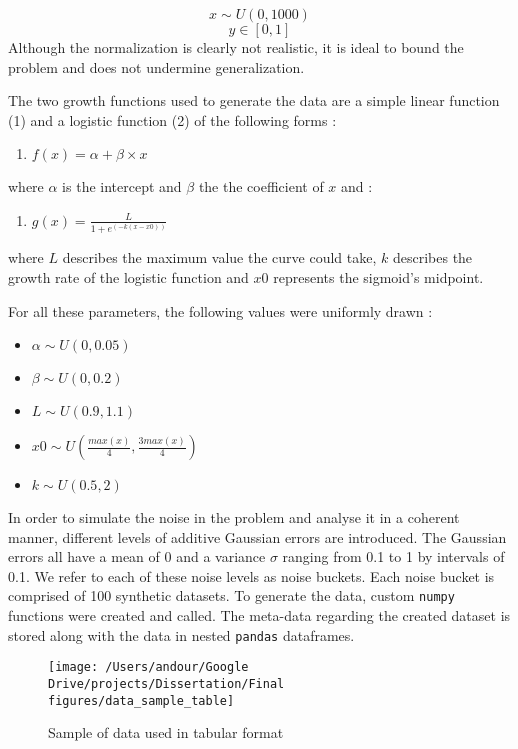 \documentclass[]{article}
\providecommand{\tightlist}{%
  \setlength{\itemsep}{0pt}\setlength{\parskip}{0pt}}
\begin{document}
\[x \sim U(0, 1000)\] \[y \in[0, 1]\] Although the normalization is
clearly not realistic, it is ideal to bound the problem and does not
undermine generalization.

The two growth functions used to generate the data are a simple linear
function (1) and a logistic function (2) of the following forms :

\begin{enumerate}
\def\labelenumi{(\arabic{enumi})}
\tightlist
\item
  \(f(x) = \alpha + \beta \times x\)
\end{enumerate}

where \(\alpha\) is the intercept and \(\beta\) the the coefficient of
\(x\) and :

\begin{enumerate}
\def\labelenumi{(\arabic{enumi})}
\setcounter{enumi}{1}
\tightlist
\item
  \(g(x) = \frac {L} {1 + e^ {(-k(x - x0))}}\)
\end{enumerate}

where \(L\) describes the maximum value the curve could take, \(k\)
describes the growth rate of the logistic function and \(x0\) represents
the sigmoid's midpoint.

For all these parameters, the following values were uniformly drawn :

\begin{itemize}
\tightlist
\item
  \(\alpha \sim U(0, 0.05)\)
\item
  \(\beta \sim U(0,0.2)\)
\item
  \(L \sim U(0.9, 1.1)\)
\item
  \(x0 \sim U(\frac{max(x)}{4} , \frac {3max(x)}{4})\)
\item
  \(k \sim U(0.5, 2)\)
\end{itemize}

In order to simulate the noise in the problem and analyse it in a
coherent manner, different levels of additive Gaussian errors are
introduced. The Gaussian errors all have a mean of 0 and a variance
\(\sigma\) ranging from 0.1 to 1 by intervals of 0.1. We refer to each
of these noise levels as noise buckets. Each noise bucket is comprised
of 100 synthetic datasets. To generate the data, custom \texttt{numpy}
functions were created and called. The meta-data regarding the created
dataset is stored along with the data in nested \texttt{pandas}
dataframes.

\begin{figure}

{\centering \texttt{[image: /Users/andour/Google Drive/projects/Dissertation/Final figures/data\_sample\_table]} 

}

\caption{Sample of data used in tabular format}\label{fig:unnamed-chunk-1}
\end{figure}
\end{document}
